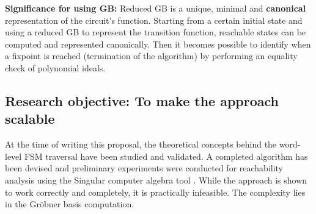 \begin{Example}
% 
\end{Example}

{\bf Significance for using GB:} Reduced GB is a unique, minimal and
{\bf canonical} representation of the circuit's function. Starting
from a certain initial state and using a reduced GB to represent the
transition function, reachable states can be computed and represented
canonically. Then it becomes possible to identify  when a fixpoint
is reached (termination of the algorithm) by performing an equality
check of polynomial ideals. 

\subsection{Research objective: To make the approach scalable}

At the time of writing this proposal, the theoretical concepts behind
the word-level FSM traversal have been studied and validated. A
completed algorithm has been devised and preliminary experiments were
conducted for reachability analysis using the {\sc Singular} computer
algebra tool \cite{DGPS}. While the approach is shown to work
correctly and completely, it is practically infeasible. The complexity
lies in the Gr\"obner basis computation. 

